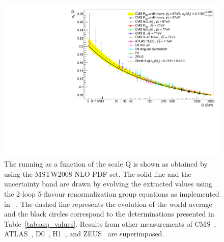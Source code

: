 %

\begin{figure}[tbp]
 \hspace*{-4mm}\includegraphics[width=1.05\textwidth]{Plots_HT_2_150/Running_alphas_8TeV_R32.pdf}
 \caption{The running \alpsq as a function of the scale Q is shown as obtained by using the MSTW2008 NLO PDF set. The solid line and the uncertainty band are drawn by evolving the extracted \alpsmz values using the 2-loop 5-flavour renormalization group equations as implemented in \RunDec~\cite{Chetyrkin:2000yt,Schmidt:2012az}. The dashed line represents the evolution of the world average~\cite{Patrignani:2016xqp} and the black circles correspond to the \alpsq determinations presented in Table~\ref{tab:asq_values}. Results from other measurements of CMS~\cite{Chatrchyan:2013txa, Chatrchyan:2013haa, Khachatryan:2014waa, CMS:2014mna, Khachatryan:2016mlc}, ATLAS~\cite{ATLAS:2015yaa}, D0~\cite{Abazov:2009nc, Abazov:2012lua}, H1~\cite{Andreev:2014wwa, Andreev:2016tgi}, and ZEUS~\cite{Abramowicz:2012jz} are superimposed.}
 \label{fig:running_alphas}
\end{figure}
